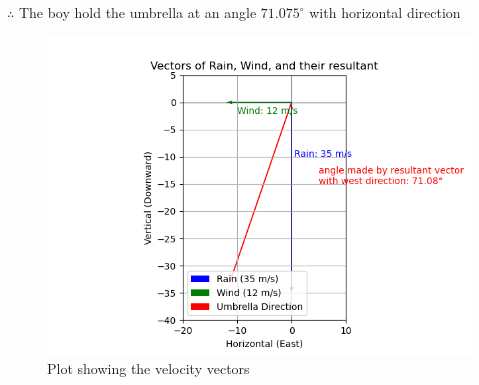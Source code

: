 \documentclass[journal]{IEEEtran}
\begin{document}
 $\therefore$ The boy hold the umbrella at an angle $71.075^\circ$ with           horizontal direction \\

 \begin{figure}[h!]
   \centering
   \includegraphics[width=0.7\linewidth]{figs/figure1.png.jpg}
   \caption{Plot showing the velocity vectors}
   \label{stemplot}
\end{figure}
\end{document}
